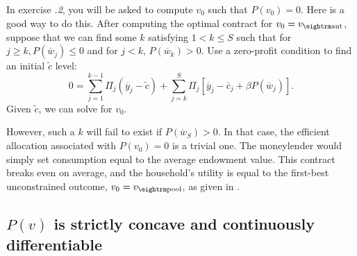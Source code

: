 \noindent
In exercise {\it \the\chapternum.2\/}, you will be asked to compute $v_0$ such that $P(v_0)=0$.
Here is a good way to do this.   After computing the optimal contract for
$v_0 = v_{\rm aut}$, suppose that we can find some $k$ satisfying
$1 < k \leq S$ such that
for $j \geq k,  P(\overline w_j) \leq 0$ and for $j< k$, $P(\overline w_k)
  > 0$.   Use a zero-profit
condition to find an initial $\tilde c$ level:
$$ 0 = \sum_{j=1}^{k-1} \Pi_j (\overline y_j - \tilde c)
  + \sum_{j=k}^S \Pi_j \left[ \overline y_j - \overline c_j
  + \beta P(\overline w_j) \right] .$$
Given $\tilde c$, we can solve
for $v_0$.

However, such a $k$ will fail to exist if $P(\overline w_S) > 0$.
In that case, the efficient allocation associated with $P(v_0)=0$
is a trivial one. The moneylender would simply set consumption equal
to the average endowment value. This contract breaks  even on
average, and the household's utility is equal to the first-best
unconstrained outcome, $v_0 = v_{\rm pool}$, as given in
.


\subsection{$P(v)$ is strictly concave and continuously differentiable}

